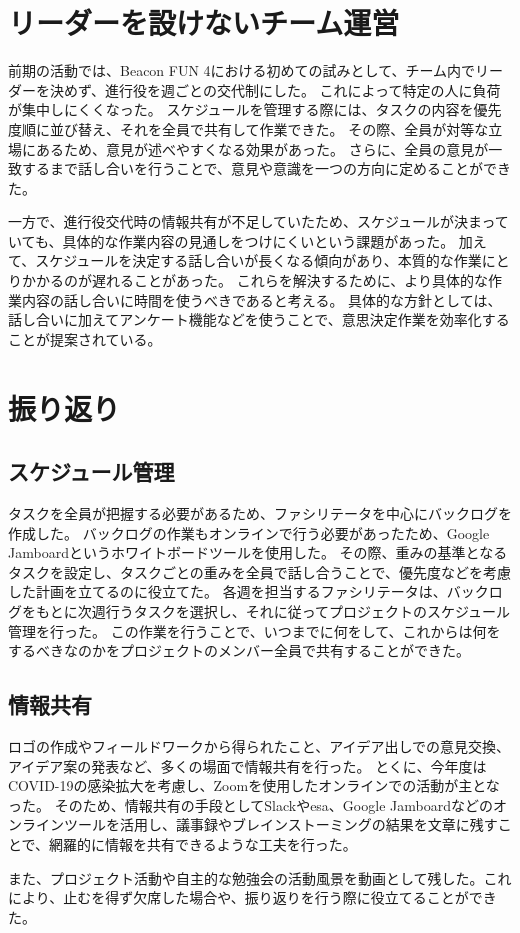 \section{リーダーを設けないチーム運営}
前期の活動では、Beacon FUN 4における初めての試みとして、チーム内でリーダーを決めず、進行役を週ごとの交代制にした。
これによって特定の人に負荷が集中しにくくなった。
スケジュールを管理する際には、タスクの内容を優先度順に並び替え、それを全員で共有して作業できた。
その際、全員が対等な立場にあるため、意見が述べやすくなる効果があった。
さらに、全員の意見が一致するまで話し合いを行うことで、意見や意識を一つの方向に定めることができた。

一方で、進行役交代時の情報共有が不足していたため、スケジュールが決まっていても、具体的な作業内容の見通しをつけにくいという課題があった。
加えて、スケジュールを決定する話し合いが長くなる傾向があり、本質的な作業にとりかかるのが遅れることがあった。
これらを解決するために、より具体的な作業内容の話し合いに時間を使うべきであると考える。
具体的な方針としては、話し合いに加えてアンケート機能などを使うことで、意思決定作業を効率化することが提案されている。

\section{振り返り}
\subsection{スケジュール管理}
タスクを全員が把握する必要があるため、ファシリテータを中心にバックログを作成した。
バックログの作業もオンラインで行う必要があったため、Google Jamboardというホワイトボードツールを使用した。
その際、重みの基準となるタスクを設定し、タスクごとの重みを全員で話し合うことで、優先度などを考慮した計画を立てるのに役立てた。
各週を担当するファシリテータは、バックログをもとに次週行うタスクを選択し、それに従ってプロジェクトのスケジュール管理を行った。
この作業を行うことで、いつまでに何をして、これからは何をするべきなのかをプロジェクトのメンバー全員で共有することができた。

\subsection{情報共有}
ロゴの作成やフィールドワークから得られたこと、アイデア出しでの意見交換、アイデア案の発表など、多くの場面で情報共有を行った。
とくに、今年度はCOVID-19の感染拡大を考慮し、Zoomを使用したオンラインでの活動が主となった。
そのため、情報共有の手段としてSlackやesa、Google Jamboardなどのオンラインツールを活用し、議事録やブレインストーミングの結果を文章に残すことで、網羅的に情報を共有できるような工夫を行った。

また、プロジェクト活動や自主的な勉強会の活動風景を動画として残した。これにより、止むを得ず欠席した場合や、振り返りを行う際に役立てることができた。
